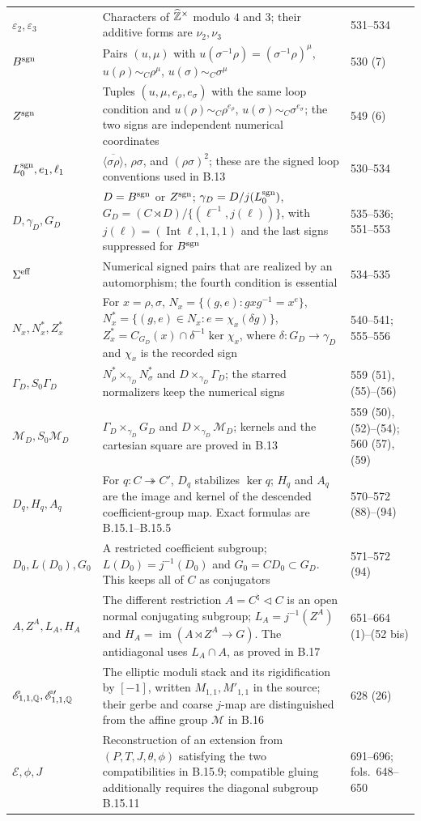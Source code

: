 \begin{longtable}{p{.17\linewidth}p{.57\linewidth}p{.16\linewidth}}
$\varepsilon_2,\varepsilon_3$&Characters of $\widehat{\mathbb Z}^\times$ modulo $4$ and $3$; their additive forms are $\nu_2,\nu_3$&531--534\\
$B^{\rm sgn}$&Pairs $(u,\mu)$ with $u(\sigma^{-1}\rho)=(\sigma^{-1}\rho)^\mu$, $u(\rho)\sim_C\rho^\mu$, $u(\sigma)\sim_C\sigma^\mu$&530 (7)\\
$Z^{\rm sgn}$&Tuples $(u,\mu,e_\rho,e_\sigma)$ with the same loop condition and $u(\rho)\sim_C\rho^{e_\rho}$, $u(\sigma)\sim_C\sigma^{e_\sigma}$; the two signs are independent numerical coordinates&549 (6)\\
$L_0^{\rm sgn},e_1,\ell_1$&$\overline{\langle\sigma\rho\rangle}$, $\rho\sigma$, and $(\rho\sigma)^2$; these are the signed loop conventions used in B.13&530--534\\
$D,\gamma_D,G_D$&$D=B^{\rm sgn}$ or $Z^{\rm sgn}$; $\gamma_D=D/j(L_0^{\rm sgn})$, $G_D=(C\rtimes D)/\{(\ell^{-1},j(\ell))\}$, with $j(\ell)=(\operatorname{Int}\ell,1,1,1)$ and the last signs suppressed for $B^{\rm sgn}$&535--536; 551--553\\
$\Sigma^{\rm eff}$&Numerical signed pairs that are realized by an automorphism; the fourth condition is essential&534--535\\
$N_x,N_x^*,Z_x^*$&For $x=\rho,\sigma$, $N_x=\{(g,e):gxg^{-1}=x^e\}$, $N_x^*=\{(g,e)\in N_x:e=\chi_x(\delta g)\}$, $Z_x^*=C_{G_D}(x)\cap\delta^{-1}\ker\chi_x$, where $\delta:G_D\to\gamma_D$ and $\chi_x$ is the recorded sign&540--541; 555--556\\
$\Gamma_D,S_0\Gamma_D$&$N_\rho^*\times_{\gamma_D}N_\sigma^*$ and $D\times_{\gamma_D}\Gamma_D$; the starred normalizers keep the numerical signs&559 (51), (55)--(56)\\
$\mathcal M_D,S_0\mathcal M_D$&$\Gamma_D\times_{\gamma_D}G_D$ and $D\times_{\gamma_D}\mathcal M_D$; kernels and the cartesian square are proved in B.13&559 (50), (52)--(54); 560 (57), (59)\\
$D_q,H_q,A_q$&For $q:C\twoheadrightarrow C'$, $D_q$ stabilizes $\ker q$; $H_q$ and $A_q$ are the image and kernel of the descended coefficient-group map. Exact formulas are B.15.1--B.15.5&570--572 (88)--(94)\\
$D_0,L(D_0),G_0$&A restricted coefficient subgroup; $L(D_0)=j^{-1}(D_0)$ and $G_0=CD_0\subset G_D$. This keeps all of $C$ as conjugators&571--572 (94)\\
$A,Z^A,L_A,H_A$&The different restriction $A=C^\natural\triangleleft C$ is an open normal conjugating subgroup; $L_A=j^{-1}(Z^A)$ and $H_A=\operatorname{im}(A\rtimes Z^A\to G)$. The antidiagonal uses $L_A\cap A$, as proved in B.17&651--664 (1)--(52 bis)\\
$\mathscr E_{1,1,\mathbb Q},\mathscr E'_{1,1,\mathbb Q}$&The elliptic moduli stack and its rigidification by $[-1]$, written $M_{1,1},M'_{1,1}$ in the source; their gerbe and coarse $j$-map are distinguished from the affine group $\mathcal M$ in B.16&628 (26)\\
$\mathcal E,\phi,J$&Reconstruction of an extension from $(P,T,J,\theta,\phi)$ satisfying the two compatibilities in B.15.9; compatible gluing additionally requires the diagonal subgroup B.15.11&691--696; fols.~648--650\\\bottomrule
\end{longtable}
